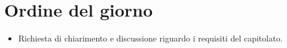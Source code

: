 \section{Ordine del giorno}

\begin{itemize}
\item Richiesta di chiarimento e discussione riguardo i requisiti del capitolato.
\end{itemize}